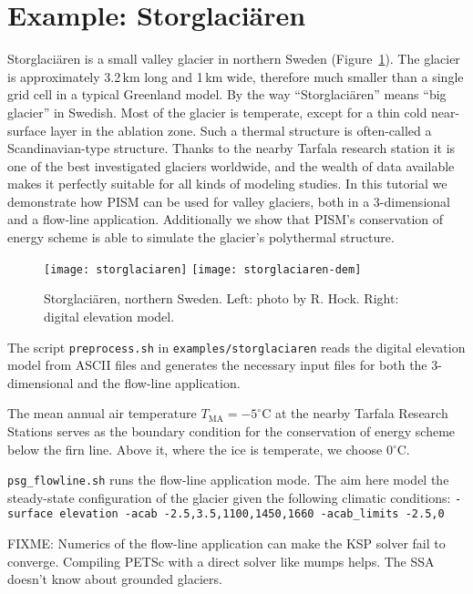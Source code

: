 
\section{Example: Storglaci{\"a}ren}\label{sec:storglaciaren} 

Storglaci{\"a}ren is a small valley glacier in northern Sweden (Figure~\ref{fig:storglaciaren}). The glacier is approximately 3.2\,km long and 1\,km wide, therefore much smaller than a single grid cell in a typical Greenland model. By the way ``Storglaci{\"a}ren'' means ``big glacier'' in Swedish. Most of the glacier is temperate, except for a thin cold near-surface layer in the ablation zone. Such a thermal structure is often-called a Scandinavian-type structure. Thanks to the nearby Tarfala research station it is one of the best investigated glaciers worldwide, and the wealth of data available makes it perfectly suitable for all kinds of modeling studies. In this tutorial we demonstrate how PISM can be used for valley glaciers, both in a 3-dimensional and a flow-line application. Additionally we show that PISM's conservation of energy scheme is able to simulate the glacier's polythermal structure.

\begin{figure}[ht]
  \centering
  \texttt{[image: storglaciaren]}\qquad
  \texttt{[image: storglaciaren-dem]}
  \caption{Storglaci{\"a}ren, northern Sweden. Left: photo by R. Hock. Right: digital elevation model.}
  \label{fig:storglaciaren}
\end{figure}

The script \texttt{preprocess.sh} in \texttt{examples/storglaciaren} reads the digital elevation model from ASCII files and generates the necessary input files for both the 3-dimensional and the flow-line application. 

The mean annual air temperature $T_{\mathrm{MA}}=-5^{\circ}$C at the nearby Tarfala Research Stations serves as the boundary condition for the conservation of energy scheme below the firn line. Above it, where the ice is temperate, we choose 0$^{\circ}$C. 



\texttt{psg_flowline.sh} runs the flow-line application mode. The aim here model the steady-state configuration of the glacier given the following climatic conditions: \texttt{-surface elevation -acab -2.5,3.5,1100,1450,1660 -acab_limits -2.5,0}


FIXME: Numerics of the flow-line application can make the KSP solver fail to converge. Compiling PETSc with a direct solver like mumps helps. The SSA doesn't know about grounded glaciers.